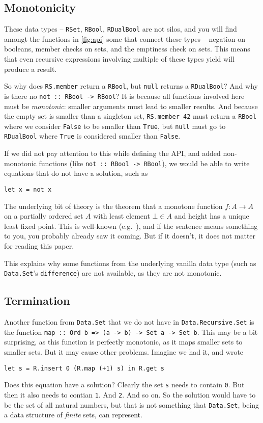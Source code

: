 \documentclass[manuscript,screen,acmsmall]{acmart}
\begin{document}
\subsection{Monotonicity}\label{sec:monotonicity}

These data types -- \verb|RSet|, \verb|RBool|, \verb|RDualBool| are not silos, and you will find amongt the functions in \cref{fig:api} some that connect these types -- negation on booleans, member checks on sets, and the emptiness check on sets.
This means that even recursive expressions involving multiple of these types yield will produce a result.

So why does \verb|RS.member| return a \verb|RBool|, but \verb|null| returns a \verb|RDualBool|? And why is there no \verb|not :: RBool -> RBool|? It is because all functions involved here must be \emph{monotonic}: smaller arguments must lead to smaller results. And because the empty set is smaller than a singleton set, \verb|RS.member 42| must return a \verb|RBool| where we consider \verb|False| to be smaller than \verb|True|, but \verb|null| must go to \verb|RDualBool| where \verb|True| is considered smaller than \verb|False|.

If we did not pay attention to this while defining the API, and added non-monotonic functions (like \verb|not :: RBool -> RBool|), we would be able to write equations that do not have a solution, such as
\begin{verbatim}
let x = not x
\end{verbatim}

The underlying bit of theory is the theorem that a monotone function $f : A \to A$ on a partially ordered set $A$ with least element $\bot \in A$ and height has a unique least fixed point. This is well-known (e.g.\ \citet{lazyleast}), and if the sentence means something to you, you probably already saw it coming. But if it doesn't, it does not matter for reading this paper.

This explains why some functions from the underlying vanilla data type (such as \verb|Data.Set|'s \verb|difference|) are not available, as they are not monotonic.

\subsection{Termination}

Another function from \verb|Data.Set| that we do not have in \verb|Data.Recursive.Set| is the function \verb|map :: Ord b => (a -> b) -> Set a -> Set b|. This may be a bit surprising, as this function is perfectly monotonic, as it maps smaller sets to smaller sets. But it may cause other problems. Imagine we had it, and wrote
\begin{verbatim}
let s = R.insert 0 (R.map (+1) s) in R.get s
\end{verbatim}
Does this equation have a solution? Clearly the set \verb|s| needs to contain \verb|0|. But then it also needs to contian \verb|1|. And \verb|2|. And so on. So the solution would have to be the set of all natural numbers, but that is not something that \verb|Data.Set|, being a data structure of \emph{finite} sets, can represent.
\end{document}
